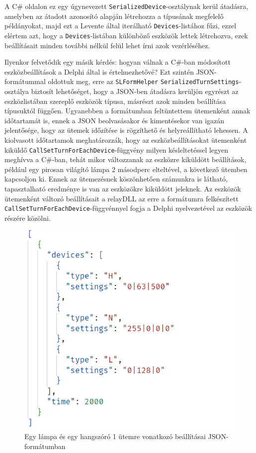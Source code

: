 \documentclass[tocnopagenum]{thesis-ekf}
\begin{document}
		A C\# oldalon ez egy úgynevezett \verb*|SerializedDevice|-osztálynak kerül átadásra, amelyben az átadott azonosító alapján létrehozza a típusának megfelelő példányokat, majd ezt a Levente által iterálható \verb*|Devices|-listához fűzi, ezzel elértem azt, hogy a \verb*|Devices|-listában különböző eszközök lettek létrehozva, ezek beállításait minden további nélkül felül lehet írni azok vezérléséhez.
	
		Ilyenkor felvetődik egy másik kérdés: hogyan válnak a C\#-ban módosított eszközbeállítások a Delphi által is értelmezhetővé? Ezt szintén JSON-formátummal oldottuk meg, erre az \verb*|SLFormHelper| \verb*|SerializedTurnSettings|-osztálya biztosít lehetőséget, hogy a JSON-ben átadásra kerüljön egyrészt az eszközlistában szereplő eszközök típusa, másrészt azok minden beállítása típusuktól függően. Ugyanebben a formátumban feltüntettem ütemenként annak időtartamát is, ennek a JSON beolvasásakor és kimentésekor van igazán jelentősége, hogy az ütemek időzítése is rögzíthető és helyreállítható lehessen. A kiolvasott időtartamok meghatározzák, hogy az eszközbeállításokat ütemenként kiküldő \verb*|CallSetTurnForEachDevice|-függvény milyen késleltetéssel legyen meghívva a C\#-ban, tehát mikor változzanak az eszközre kiküldött beállítások, például egy pirosan világító lámpa 2 másodperc elteltével, a következő ütemben kapcsoljon ki. Ennek az ütemezésnek köszönhetően számunkra is látható, tapasztalható eredménye is van az eszközökre kiküldött jeleknek.
		Az eszközök ütemenként változó beállításait a relayDLL az erre a formátumra felkészített \verb*|CallSetTurnForEachDevice|-függvénnyel fogja a Delphi nyelvezetével az eszközök részére közölni.
	\begin{figure}[H]
		\centering
		\includegraphics[scale=0.6]{images/json_szerializalas_utemek.PNG}
		\caption{Egy lámpa és egy hangszóró 1 ütemre vonatkozó beállításai JSON-formátumban}
		\label{fig:json_settings}
	\end{figure}	
	
\end{document}
